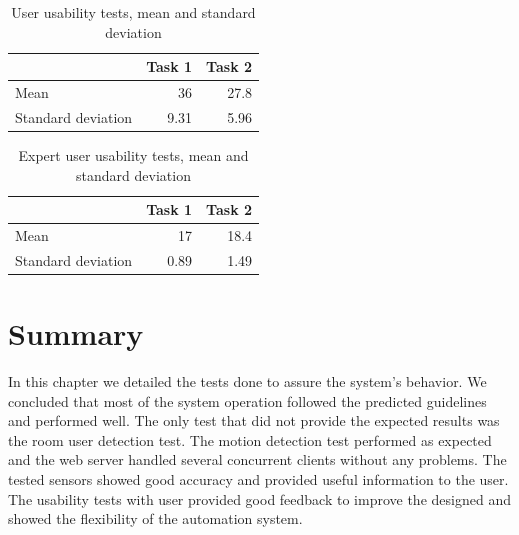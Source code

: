 \begin{table}[]
\centering
\begin{tabular}{l|r|r|}
\cline{2-3}
 & \multicolumn{1}{l|}{Task 1} & \multicolumn{1}{l|}{Task 2} \\ \hline
\multicolumn{1}{|l|}{Mean} & 36 & 27.8 \\ \hline
\multicolumn{1}{|l|}{Standard deviation} & 9.31 & 5.96 \\ \hline
\end{tabular}
\caption{User usability tests, mean and standard deviation}
\label{eval:automation2}
\end{table}


\begin{table}[]
\centering
\begin{tabular}{l|r|r|}
\cline{2-3}
 & \multicolumn{1}{l|}{Task 1} & \multicolumn{1}{l|}{Task 2} \\ \hline
\multicolumn{1}{|l|}{Mean} & 17 & 18.4 \\ \hline
\multicolumn{1}{|l|}{Standard deviation} & 0.89 & 1.49 \\ \hline
\end{tabular}
\caption{Expert user usability tests, mean and standard deviation}
\label{eval:automation3}
\end{table}


\section{Summary}


In this chapter we detailed the tests done to assure the system’s behavior. We concluded that most of the system operation followed the predicted guidelines and performed well. The only test that did not provide the expected results was the room user detection test. The motion detection test performed as expected and the web server handled several concurrent clients without any problems. The tested sensors showed good accuracy and provided useful information to the user. The usability tests with user provided good feedback to improve the designed and showed the flexibility of the automation system.

